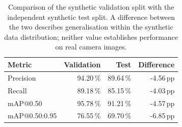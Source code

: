 \begin{table}[htbp]
\centering
\caption{Comparison of the synthetic validation split with the independent synthetic test split. A difference between the two describes generalisation within the synthetic data distribution; neither value establishes performance on real camera images.}
\label{tab:val-vs-test}
\begin{tabular}{|l|r|r|r|}
\hline
\textbf{Metric} & \textbf{Validation} & \textbf{Test} & \textbf{Difference} \\
\hline
Precision & 94.20\,\% & 89.64\,\% & -4.56\,pp \\
\hline
Recall & 89.18\,\% & 85.15\,\% & -4.03\,pp \\
\hline
mAP@0.50 & 95.78\,\% & 91.21\,\% & -4.57\,pp \\
\hline
mAP@0.50:0.95 & 76.55\,\% & 69.70\,\% & -6.85\,pp \\
\hline
\end{tabular}
\end{table}
